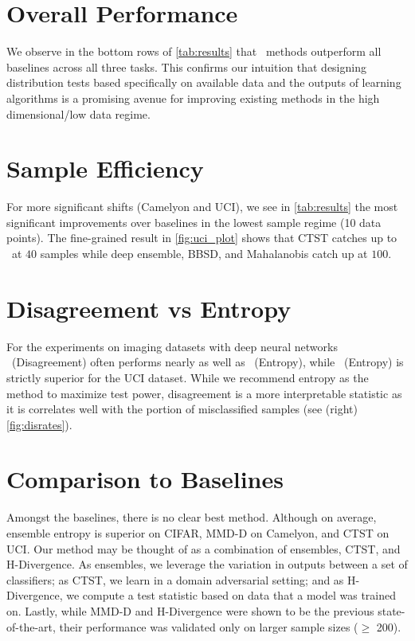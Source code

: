 \section{Overall Performance}
We observe in the bottom rows of \autoref{tab:results} that \method\ methods outperform all baselines across all three tasks.
This confirms our intuition that designing distribution tests based specifically on available data and the outputs of learning algorithms is a promising avenue for improving existing methods in the high dimensional/low data regime.

\section{Sample Efficiency}
For more significant shifts (Camelyon and UCI), we see in \autoref{tab:results} the most significant improvements over baselines in the lowest sample regime (10 data points).
The fine-grained result in \autoref{fig:uci_plot} shows that CTST catches up to \method\ at $40$ samples while deep ensemble, BBSD, and Mahalanobis catch up at $100$.

\section{Disagreement vs Entropy}
For the experiments on imaging datasets with deep neural networks \method\ (Disagreement) often performs nearly as well as \method\ (Entropy),
while \method\ (Entropy) is strictly superior for the UCI dataset.
While we recommend entropy as the method to maximize test power, disagreement is a more interpretable statistic as it is correlates well with the portion of misclassified samples (see (right) \autoref{fig:disrates}).

\section{Comparison to Baselines}
Amongst the baselines, there is no clear best method.
Although on average, ensemble entropy is superior on CIFAR, MMD-D on Camelyon, and CTST on UCI. Our method may be thought of as a combination of ensembles, CTST, and H-Divergence.
As ensembles, we leverage the variation in outputs between a set of classifiers;
as CTST, we learn in a domain adversarial setting;
and as H-Divergence, we compute a test statistic based on data that a model was trained on.
Lastly, while MMD-D and H-Divergence were shown to be the previous state-of-the-art, their performance was validated only on larger sample sizes ($\geq$ 200).

